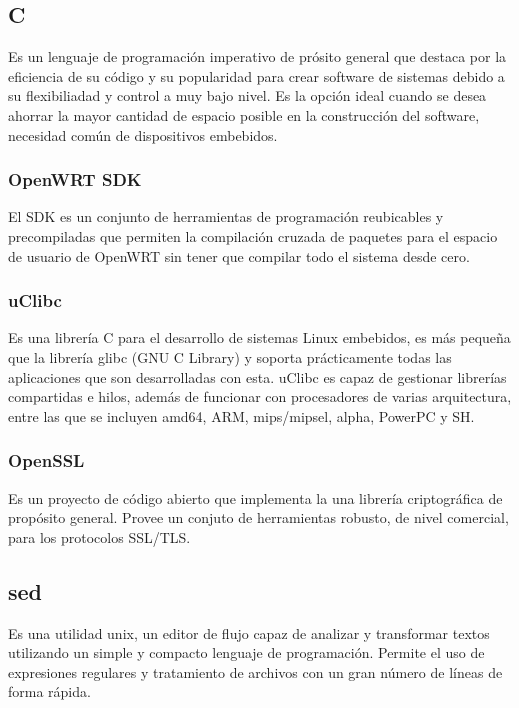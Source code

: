 \documentclass{article}
\begin{document}
    \subsection{C}
    Es un lenguaje de programación imperativo de prósito general que destaca por la eficiencia de su código y su popularidad para crear software de sistemas debido a su flexibiliadad y control a muy bajo nivel. Es la opción ideal cuando se desea ahorrar la mayor cantidad de espacio posible en la construcción del software, necesidad común de dispositivos embebidos. 

        \subsubsection{OpenWRT SDK}
        El SDK es un conjunto de herramientas de programación reubicables y precompiladas que permiten la compilación cruzada de paquetes para el espacio de usuario de OpenWRT sin tener que compilar todo el sistema desde cero.

        \subsubsection{uClibc}
        Es una librería C para el desarrollo de sistemas Linux embebidos, es más pequeña que la librería  glibc (GNU C Library) y soporta prácticamente todas las aplicaciones que son desarrolladas con esta. uClibc  es capaz de gestionar librerías compartidas e hilos, además de funcionar con procesadores de varias arquitectura, entre las que se incluyen amd64, ARM, mips/mipsel, alpha, PowerPC y SH.

        \subsubsection{OpenSSL}
        Es un proyecto de código abierto que implementa la una librería criptográfica de propósito general. Provee un conjuto de herramientas robusto, de nivel comercial, para los protocolos SSL/TLS.

    
    \subsection{sed}
    Es una utilidad unix, un editor de flujo capaz de analizar y transformar textos utilizando un simple y compacto lenguaje de programación. Permite el uso de expresiones regulares y tratamiento de archivos con un gran número de líneas de forma rápida.
\end{document}
